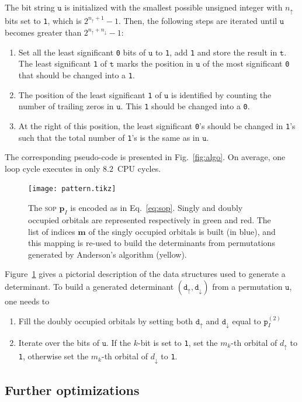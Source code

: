 \documentclass[aip,jcp,reprint,showkeys]{revtex4-1}
\newcommand{\tu}{\mathtt{u}}
\newcommand{\ttt}{\mathtt{t}}
\newcommand{\md}{\mathtt{d}}
\newcommand{\mpp}{\mathtt{p}}
\newcommand{\mpv}{\mathbf{p}}
\newcommand{\up}{\uparrow}
\newcommand{\dn}{\downarrow}
\newcommand{\one}{{\texttt{1}}}
\newcommand{\zero}{{\texttt{0}}}
\newcommand{\sop}{\textsc{sop}}
\begin{document}
The bit string $\tu$ is initialized with the smallest possible unsigned integer with
$n_\up$ bits set to \one, which is $2^{n_\up+1}-1$. Then, the
following steps are iterated until $\tu$ becomes greater than $2^{n_\up+n_\dn}-1$:
\begin{enumerate}
    \item Set all the least significant \zero{} bits of $\tu$ to \one{}, add \one{} and store the result in $\ttt$. The least significant \one{} of $\ttt$ marks the position in $\tu$ of the most significant \zero{} that should be changed into a \one{}.
    \item The position of the least significant \one{} of $\tu$ is identified by counting the number of trailing zeros in $\tu$. This \one{} should be changed into a \zero{}.
    \item At the right of this position, the least significant \zero's should be changed in \one's such that the total number of \one's is the same as in $\tu$.
\end{enumerate}
The corresponding pseudo-code is presented in Fig.~\ref{fig:algo}. On average, one loop cycle executes in only $8.2$~CPU cycles.

\begin{figure}[t]
\texttt{[image: pattern.tikz]} 
\caption{The {\sop} $\mpv_I$ is encoded as in Eq.~\eqref{eq:sop}. Singly and doubly
occupied orbitals are represented respectively in green and red.
The list of indices $\mathbf{m}$ of the singly occupied orbitals is built (in blue), and this
mapping is re-used to build the determinants from permutations generated by Anderson's algorithm (yellow).}
\label{fig:mapping}
\end{figure}

Figure~\ref{fig:mapping} gives a pictorial description of the data structures used to generate a determinant.
To build a generated determinant $(\md_\up,\md_\dn)$ from a permutation $\tu$, one needs to
\begin{enumerate}
    \item Fill the doubly occupied orbitals by setting both $\md_\up$ and $\md_\dn$
          equal to $\mpp_I^{(2)}$
    \item Iterate over the bits of $\tu$. If the $k$-bit is set to \one{}, set the $m_k$-th orbital of $d_\up$ to \one, otherwise set the $m_k$-th orbital of $d_\dn$ to \one.
\end{enumerate}

\subsection{Further optimizations}
\end{document}
